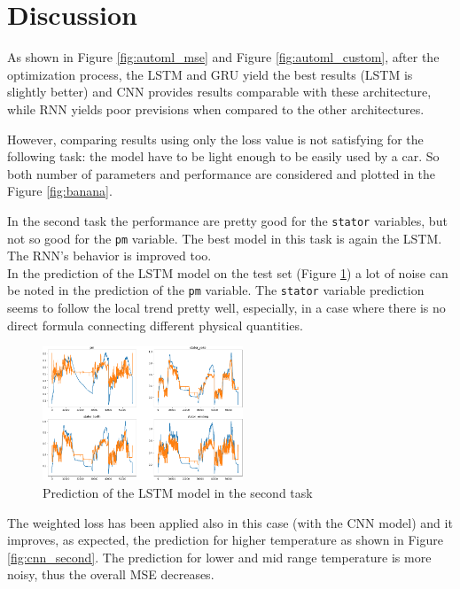 \section{Discussion}
As shown in Figure \ref{fig:automl_mse} and Figure \ref{fig:automl_custom}, after the optimization process, the LSTM and GRU yield the best results (LSTM is slightly better) and CNN provides results comparable with these architecture, while RNN yields poor previsions when compared to the other architectures.

However, comparing results using only the loss value is not satisfying for the following task: the model have to be light enough to be easily used by a car. So both number of parameters and performance are considered and plotted in the Figure \ref{fig:banana}. 


In the second task the performance are pretty good for the \verb|stator| variables, but not so good for the \verb|pm| variable. The best model in this task is again the LSTM. The RNN's behavior is improved too.\\
In the prediction of the LSTM model on the test set (Figure \ref{fig:lstm_second}) a lot of noise can be noted in the prediction of the \verb|pm| variable.
The \verb|stator| variable prediction seems to follow the local trend pretty well, especially, in a case where there is no direct formula connecting different physical quantities.

\begin{figure}[!h]
    \centering
    \includegraphics[width=\linewidth, height=4cm]{imgs/lstm_pred_second.png}
    \caption{Prediction of the LSTM model in the second task}
    \label{fig:lstm_second}
\end{figure}


The weighted loss has been applied also in this case (with the CNN model) and it improves, as expected, the prediction for higher temperature as shown in Figure \ref{fig:cnn_second}. The prediction for lower and mid range temperature is more noisy, thus the overall MSE decreases.

